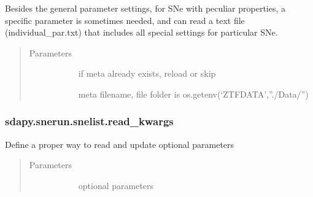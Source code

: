 \documentclass[letterpaper,10pt,english]{sphinxmanual}
\begin{document}
\begin{fulllineitems}
\begin{fulllineitems}
\label{\detokenize{generated/sdapy.snerun.snelist.parse_params:sdapy.snerun.snelist.parse_params}}
Besides the general parameter settings, for SNe with peculiar properties, a specific parameter is
sometimes needed, and  can read a text file (individual\_par.txt) that includes all special
settings for particular SNe.
\begin{quote}\begin{description}
\item[{Parameters}] \leavevmode\begin{description}
\item[{}] \leavevmode{[}\sphinxtitleref{bool}{]}
if meta already exists, reload or skip

\item[{}] \leavevmode{[}\sphinxtitleref{str}{]}
meta filename, file folder is os.getenv(‘ZTFDATA’,”./Data/”)

\end{description}

\end{description}\end{quote}

\end{fulllineitems}



\subsubsection{sdapy.snerun.snelist.read\_kwargs}
\label{\detokenize{generated/sdapy.snerun.snelist.read_kwargs:sdapy-snerun-snelist-read-kwargs}}\label{\detokenize{generated/sdapy.snerun.snelist.read_kwargs::doc}}

\begin{fulllineitems}
\label{\detokenize{generated/sdapy.snerun.snelist.read_kwargs:sdapy.snerun.snelist.read_kwargs}}
Define a proper way to read and update optional parameters
\begin{quote}\begin{description}
\item[{Parameters}] \leavevmode\begin{description}
\item[{}] \leavevmode{[}\sphinxtitleref{Keyword Arguments}{]}
optional parameters


\end{description}
\end{description}
\end{quote}
\end{fulllineitems}
\end{fulllineitems}
\end{document}
